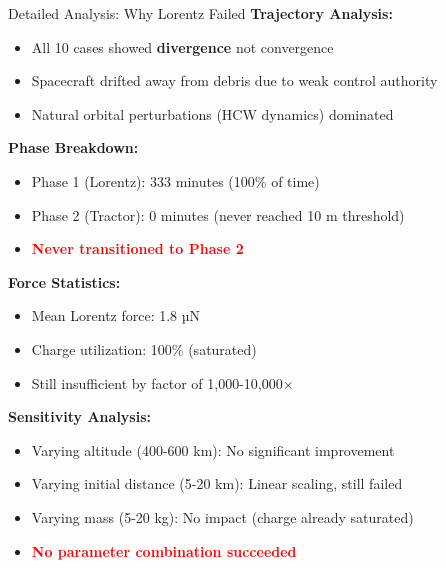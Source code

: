 \documentclass[aspectratio=169]{beamer}
\begin{document}
\begin{frame}{Detailed Analysis: Why Lorentz Failed}
\textbf{Trajectory Analysis:}

\begin{itemize}
    \item All 10 cases showed \textbf{divergence} not convergence
    \item Spacecraft drifted away from debris due to weak control authority
    \item Natural orbital perturbations (HCW dynamics) dominated
\end{itemize}

\vspace{0.3cm}
\textbf{Phase Breakdown:}
\begin{itemize}
    \item Phase 1 (Lorentz): 333 minutes (100\% of time)
    \item Phase 2 (Tractor): 0 minutes (never reached 10 m threshold)
    \item \textcolor{red}{\textbf{Never transitioned to Phase 2}}
\end{itemize}

\vspace{0.3cm}
\textbf{Force Statistics:}
\begin{itemize}
    \item Mean Lorentz force: 1.8 µN
    \item Charge utilization: 100\% (saturated)
    \item Still insufficient by factor of 1,000-10,000×
\end{itemize}

\vspace{0.3cm}
\textbf{Sensitivity Analysis:}
\begin{itemize}
    \item Varying altitude (400-600 km): No significant improvement
    \item Varying initial distance (5-20 km): Linear scaling, still failed
    \item Varying mass (5-20 kg): No impact (charge already saturated)
    \item \textcolor{red}{\textbf{No parameter combination succeeded}}
\end{itemize}
\end{frame}
\end{document}
